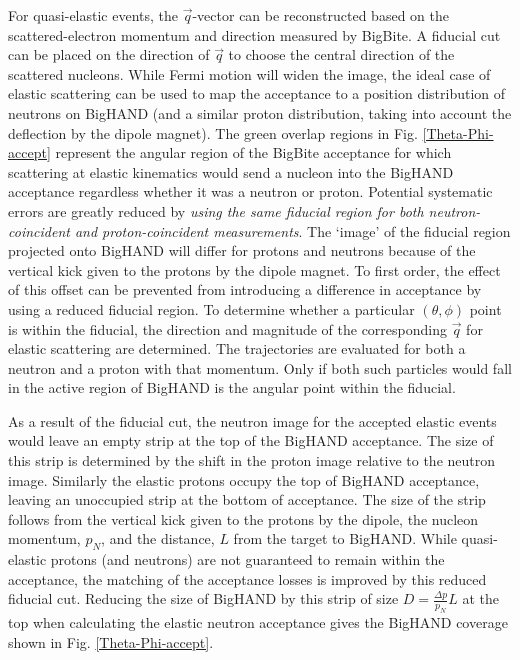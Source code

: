 \documentclass[12pt,letterpaper,oneside]{article}
\begin{document}
For quasi-elastic events, the $\vec q$-vector can be reconstructed  
based on the scattered-electron momentum and direction measured by
BigBite. 
A fiducial cut can
be placed on the direction of $\vec q$ to choose the central direction
of the scattered nucleons.  While Fermi motion will widen the image,
the ideal case of elastic scattering can be used to map the acceptance
to a position distribution of neutrons on BigHAND (and a similar
proton distribution, taking into account the 
deflection by the dipole magnet).
The green overlap regions in
Fig. \ref{Theta-Phi-accept}
represent the angular region of the BigBite acceptance for
which scattering at elastic kinematics would send a nucleon into the
BigHAND acceptance regardless whether it was a neutron or proton.
Potential systematic errors are greatly
reduced by {\em using the same fiducial region for both neutron-coincident
and proton-coincident measurements}.  The `image' of the fiducial
region projected onto BigHAND will differ  for protons and neutrons
because of the vertical kick given to the protons by the dipole
magnet.  To first order, the effect of this offset can be prevented
from introducing a difference in acceptance by using a reduced
fiducial region. 
To determine whether a particular $(\theta,\phi)$ point is within the
fiducial, the direction and magnitude of the corresponding $\vec{q}$
for elastic scattering are determined.  The trajectories are evaluated
for both a neutron and a proton with that momentum.  Only if both such
particles would fall in the active region of BigHAND is the angular
point within the fiducial.

As a result of the fiducial cut, the neutron image for the accepted
elastic events would leave an empty strip at the top of the BigHAND 
acceptance.   The size of this strip is
determined by the shift in the proton image relative to the neutron
image.
Similarly the elastic protons occupy the top of BigHAND acceptance, 
leaving an unoccupied strip at the bottom of acceptance.  The size of the
strip follows from the vertical kick given to the 
protons by the dipole, the nucleon momentum, $p_N$, and the distance, $L$ from the
target to BigHAND.  While quasi-elastic protons (and neutrons) are not
guaranteed to remain within the acceptance, the matching of the 
acceptance losses is improved by this reduced fiducial cut.
Reducing the size of BigHAND by this strip of size
$D=\frac{\Delta p}{p_N}L$ at the top when calculating the elastic
neutron acceptance gives the BigHAND coverage shown in Fig. 
\ref{Theta-Phi-accept}.
\end{document}
